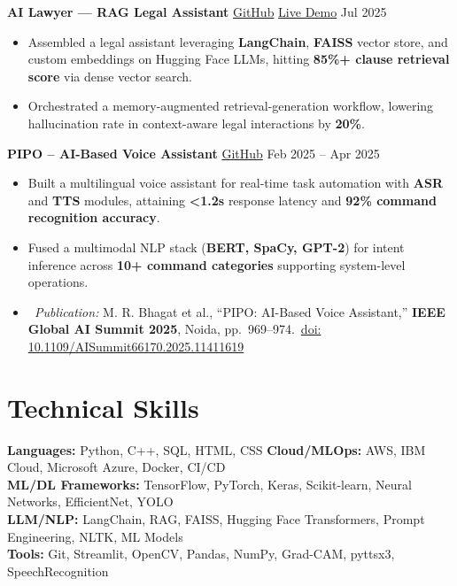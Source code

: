 \documentclass[a4paper,10pt]{article}
\begin{document}
\textbf{AI Lawyer — RAG Legal Assistant} \quad
\href{https://github.com/mayankbhagat/AI-Lawyer-RAG}{GitHub} \quad
\href{https://legallaw-ai.streamlit.app/}{Live Demo} \hfill Jul 2025
\begin{itemize}[leftmargin=*]
\item Assembled a legal assistant leveraging \textbf{LangChain}, \textbf{FAISS} vector store, and custom embeddings on Hugging Face LLMs, hitting \textbf{85\%+ clause retrieval score} via dense vector search.
\item Orchestrated a memory-augmented retrieval-generation workflow, lowering hallucination rate in context-aware legal interactions by \textbf{20\%}.
\end{itemize}

\textbf{PIPO – AI-Based Voice Assistant} \quad
\href{https://github.com/mayankbhagat/PIPO-AI-VOICE-ASSISTTANT.git}{GitHub} \hfill Feb 2025 -- Apr 2025
\begin{itemize}[leftmargin=*]
\item Built a multilingual voice assistant for real-time task automation with \textbf{ASR} and \textbf{TTS} modules, attaining \textbf{<1.2s} response latency and \textbf{92\% command recognition accuracy}.
\item Fused a multimodal NLP stack (\textbf{BERT, SpaCy, GPT-2}) for intent inference across \textbf{10+ command categories} supporting system-level operations.
\item \textit{\faFileText\ Publication:} M. R. Bhagat et al., ``PIPO: AI-Based Voice Assistant,'' \textbf{IEEE Global AI Summit 2025}, Noida, pp.\ 969--974.\ \href{https://ieeexplore.ieee.org/document/11411619}{doi: 10.1109/AISummit66170.2025.11411619}
\end{itemize}


\section*{Technical Skills}
\textbf{Languages:} Python, C++, SQL, HTML, CSS \hfill
\textbf{Cloud/MLOps:} AWS, IBM Cloud, Microsoft Azure, Docker, CI/CD\\
\textbf{ML/DL Frameworks:} TensorFlow, PyTorch, Keras, Scikit-learn, Neural Networks, EfficientNet, YOLO\\
\textbf{LLM/NLP:} LangChain, RAG, FAISS, Hugging Face Transformers, Prompt Engineering, NLTK, ML Models\\
\textbf{Tools:} Git, Streamlit, OpenCV, Pandas, NumPy, Grad-CAM, pyttsx3, SpeechRecognition
\end{document}
